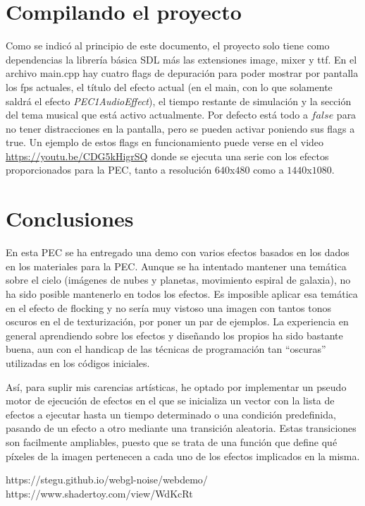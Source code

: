\documentclass[12pt]{article}%
\begin{document}

	
	

\section{Compilando el proyecto}
	Como se indicó al principio de este documento, el proyecto solo tiene como dependencias la librería básica SDL más las extensiones image, mixer y ttf. En el archivo main.cpp hay cuatro flags de depuración para poder mostrar por pantalla los fps actuales, el título del efecto actual (en el main, con lo que solamente saldrá el efecto \textit{PEC1AudioEffect}), el tiempo restante de simulación y la sección del tema musical que está activo actualmente. Por defecto está todo a $false$ para no tener distracciones en la pantalla, pero se pueden activar poniendo sus flags a true. Un ejemplo de estos flags en funcionamiento puede verse en el video \url{https://youtu.be/CDG5kHigrSQ} donde se ejecuta una serie con los efectos proporcionados para la PEC, tanto a resolución $640$x$480$ como a $1440$x$1080$.
	
\section{Conclusiones}
	En esta PEC se ha entregado una demo con varios efectos basados en los dados en los materiales para la PEC. Aunque se ha intentado mantener una temática sobre el cielo (imágenes de nubes y planetas, movimiento espiral de galaxia), no ha sido posible mantenerlo en todos los efectos. Es imposible aplicar esa temática en el efecto de flocking y no sería muy vistoso una imagen con tantos tonos oscuros en el de texturización, por poner un par de ejemplos. La experiencia en general aprendiendo sobre los efectos y diseñando los propios ha sido bastante buena, aun con el handicap de las técnicas de programación tan ``oscuras'' utilizadas en los códigos iniciales.
	
	Así, para suplir mis carencias artísticas, he optado por implementar un pseudo motor de ejecución de efectos en el que se inicializa un vector con la lista de efectos a ejecutar hasta un tiempo determinado o una condición predefinida, pasando de un efecto a otro mediante una transición aleatoria. Estas transiciones son facilmente ampliables, puesto que se trata de una función que define qué píxeles de la imagen pertenecen a cada uno de los efectos implicados en la misma.
	
	
\begin{thebibliography}{9}
 https://stegu.github.io/webgl-noise/webdemo/
 https://www.shadertoy.com/view/WdKcRt
\end{thebibliography}
\end{document}
